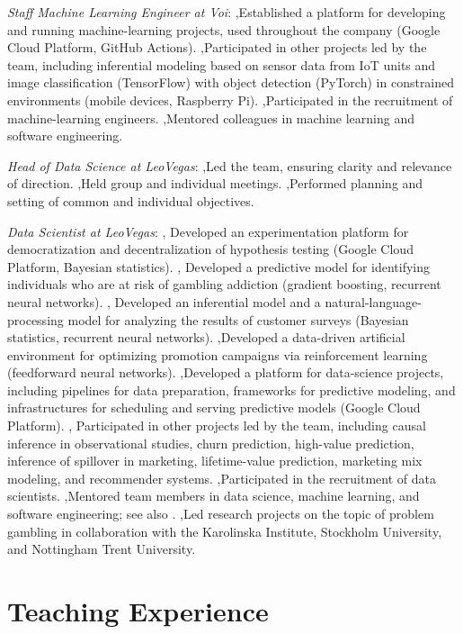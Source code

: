 \documentclass[journal]{IEEEtran}
\begin{document}
\date{February 2022--January 2023} \emph{Staff Machine Learning Engineer at
Voi}: \sep Established a platform for developing and running machine-learning
projects, used throughout the company (Google Cloud Platform, GitHub Actions).
\sep Participated in other projects led by the team, including inferential
modeling based on sensor data from IoT units and image classification
(TensorFlow) with object detection (PyTorch) in constrained environments (mobile
devices, Raspberry Pi). \sep Participated in the recruitment of machine-learning
engineers. \sep Mentored colleagues in machine learning and software
engineering.

\date{November 2019--February 2022} \emph{Head of Data Science at LeoVegas}:
\sep Led the team, ensuring clarity and relevance of direction. \sep Held group
and individual meetings. \sep Performed planning and setting of common and
individual objectives.

\date{February 2018--February 2022} \emph{Data Scientist at LeoVegas}: \sep
Developed an experimentation platform for democratization and decentralization
of hypothesis testing (Google Cloud Platform, Bayesian statistics). \sep
Developed a predictive model for identifying individuals who are at risk of
gambling addiction (gradient boosting, recurrent neural networks). \sep
Developed an inferential model and a natural-language-processing model for
analyzing the results of customer surveys (Bayesian statistics, recurrent neural
networks). \sep Developed a data-driven artificial environment for optimizing
promotion campaigns via reinforcement learning (feedforward neural networks).
\sep Developed a platform for data-science projects, including pipelines for
data preparation, frameworks for predictive modeling, and infrastructures for
scheduling and serving predictive models (Google Cloud Platform). \sep
Participated in other projects led by the team, including causal inference in
observational studies, churn prediction, high-value prediction, inference of
spillover in marketing, lifetime-value prediction, marketing mix modeling, and
recommender systems. \sep Participated in the recruitment of data scientists.
\sep Mentored team members in data science, machine learning, and software
engineering; see also . \sep Led research projects on the topic
of problem gambling in collaboration with the Karolinska Institute, Stockholm
University, and Nottingham Trent University.

\section{Teaching Experience} 
\end{document}
